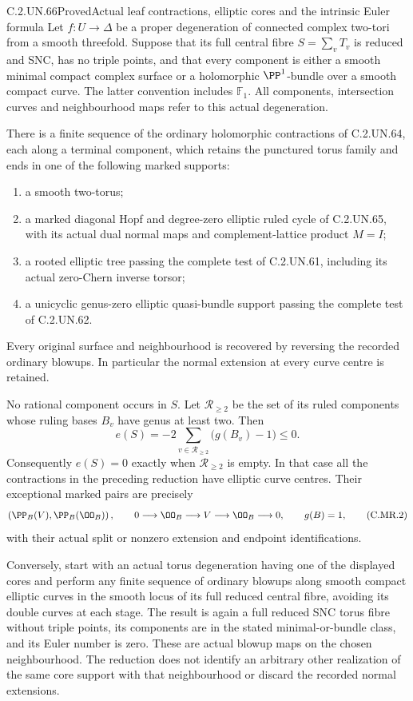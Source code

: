 \begin{statement}{C.2.UN.66}{Proved}{Actual leaf contractions, elliptic cores and the intrinsic Euler formula}
Let $f:U\to\Delta$ be a proper degeneration of connected complex
two-tori from a smooth threefold. Suppose that its full central
fibre $S=\sum_vT_v$ is reduced and SNC, has no triple points,
and that every component is either a smooth minimal compact
complex surface or a holomorphic $\PP^1$-bundle over a smooth
compact curve. The latter convention includes $\mathbb F_1$.
All components, intersection curves and neighbourhood maps refer
to this actual degeneration.

There is a finite sequence of the ordinary holomorphic
contractions of C.2.UN.64, each along a terminal component, which
retains the punctured torus family and ends in one of the
following marked supports:
\begin{enumerate}
\item a smooth two-torus;
\item a marked diagonal Hopf and degree-zero elliptic ruled
cycle of C.2.UN.65, with its actual dual normal maps and
complement-lattice product $M=I$;
\item a rooted elliptic tree passing the complete test of
C.2.UN.61, including its actual zero-Chern inverse torsor;
\item a unicyclic genus-zero elliptic quasi-bundle support
passing the complete test of C.2.UN.62.
\end{enumerate}
Every original surface and neighbourhood is recovered by
reversing the recorded ordinary blowups. In particular the
normal extension at every curve centre is retained.

No rational component occurs in $S$. Let $\mathcal R_{\ge2}$
be the set of its ruled components whose ruling bases $B_v$
have genus at least two. Then
\[
 e(S)=-2\sum_{v\in\mathcal R_{\ge2}}\bigl(g(B_v)-1\bigr)
                                                        \le0.
\tag{C.MR.1}
\]
Consequently $e(S)=0$ exactly when $\mathcal R_{\ge2}$ is
empty. In that case all the contractions in the preceding
reduction have elliptic curve centres. Their exceptional
marked pairs are precisely
\[
 \left(\PP_B(V),\PP_B(\OO_B)\right),
 \qquad
 0\longrightarrow\OO_B\longrightarrow V
             \longrightarrow\OO_B\longrightarrow0,
 \qquad g(B)=1,
\tag{C.MR.2}
\]
with their actual split or nonzero extension and endpoint
identifications.

Conversely, start with an actual torus degeneration having
one of the displayed cores and perform any finite sequence of
ordinary blowups along smooth compact elliptic curves in the
smooth locus of its full reduced central fibre, avoiding its
double curves at each stage. The result is again a full
reduced SNC torus fibre without triple points, its components
are in the stated minimal-or-bundle class, and its Euler
number is zero. These are actual blowup maps on the chosen
neighbourhood. The reduction does not identify an arbitrary
other realization of the same core support with that
neighbourhood or discard the recorded normal extensions.


\end{statement}
